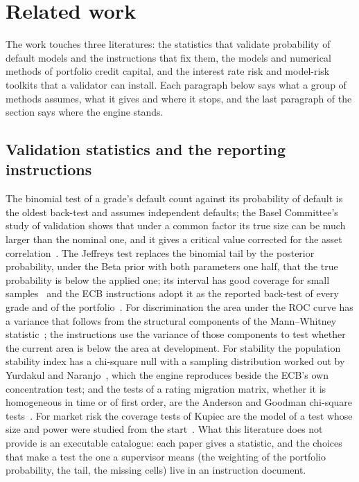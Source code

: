 \section{Related work}
\label{sec:related-work}

The work touches three literatures: the statistics that validate probability of default models and the instructions that fix them, the models and numerical methods of portfolio credit capital, and the interest rate risk and model-risk toolkits that a validator can install. Each paragraph below says what a group of methods assumes, what it gives and where it stops, and the last paragraph of the section says where the engine stands.

\subsection{Validation statistics and the reporting instructions}

The binomial test of a grade's default count against its probability of default is the oldest back-test and assumes independent defaults; the Basel Committee's study of validation shows that under a common factor its true size can be much larger than the nominal one, and it gives a critical value corrected for the asset correlation~\citep{bcbswp14}. The Jeffreys test replaces the binomial tail by the posterior probability, under the Beta prior with both parameters one half, that the true probability is below the applied one; its interval has good coverage for small samples~\citep{brown2001} and the ECB instructions adopt it as the reported back-test of every grade and of the portfolio~\citep{ecb2019}. For discrimination the area under the ROC curve has a variance that follows from the structural components of the Mann--Whitney statistic~\citep{hanley1982,delong1988}; the instructions use the variance of those components to test whether the current area is below the area at development. For stability the population stability index has a chi-square null with a sampling distribution worked out by Yurdakul and Naranjo~\citep{yurdakul2020}, which the engine reproduces beside the ECB's own concentration test; and the tests of a rating migration matrix, whether it is homogeneous in time or of first order, are the Anderson and Goodman chi-square tests~\citep{anderson1957}. For market risk the coverage tests of Kupiec are the model of a test whose size and power were studied from the start~\citep{kupiec1995}. What this literature does not provide is an executable catalogue: each paper gives a statistic, and the choices that make a test the one a supervisor means (the weighting of the portfolio probability, the tail, the missing cells) live in an instruction document.

